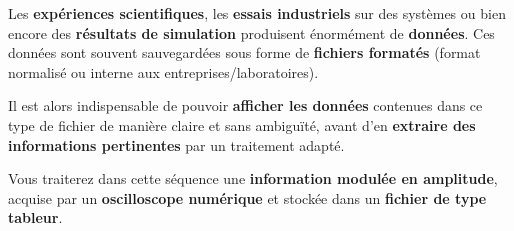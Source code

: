 Les \textbf{expériences scientifiques}, les \textbf{essais industriels} sur des systèmes ou bien encore des \textbf{résultats de simulation} produisent énormément de \textbf{données}. 
Ces données sont souvent sauvegardées sous forme de \textbf{fichiers formatés} (format normalisé ou interne aux entreprises/laboratoires).

Il est alors indispensable de pouvoir \textbf{afficher les données} contenues dans ce type de fichier de manière claire et sans ambiguïté, avant d'en \textbf{extraire des informations pertinentes} par un traitement adapté.

\medskip

Vous traiterez dans cette séquence une \textbf{information modulée en amplitude}, acquise par un \textbf{oscilloscope numérique} et stockée dans un \textbf{fichier de type tableur}.